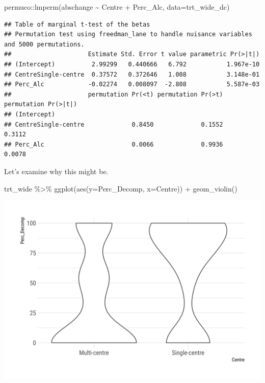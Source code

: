 \documentclass[
]{article}
\newenvironment{Shaded}{\begin{snugshade}}{\end{snugshade}}
\newcommand{\AttributeTok}[1]{\textcolor[rgb]{0.77,0.63,0.00}{#1}}
\newcommand{\FunctionTok}[1]{\textcolor[rgb]{0.00,0.00,0.00}{#1}}
\newcommand{\NormalTok}[1]{#1}
\newcommand{\SpecialCharTok}[1]{\textcolor[rgb]{0.00,0.00,0.00}{#1}}
\begin{document}
\begin{Shaded}
\begin{Highlighting}[]
\NormalTok{permuco}\SpecialCharTok{::}\FunctionTok{lmperm}\NormalTok{(abschange }\SpecialCharTok{\textasciitilde{}}\NormalTok{ Centre }\SpecialCharTok{+}\NormalTok{ Perc\_Alc, }\AttributeTok{data=}\NormalTok{trt\_wide\_dc)}
\end{Highlighting}
\end{Shaded}

\begin{verbatim}
## Table of marginal t-test of the betas
## Permutation test using freedman_lane to handle nuisance variables and 5000 permutations.
##                     Estimate Std. Error t value parametric Pr(>|t|)
## (Intercept)          2.99299   0.440666   6.792           1.967e-10
## CentreSingle-centre  0.37572   0.372646   1.008           3.148e-01
## Perc_Alc            -0.02274   0.008097  -2.808           5.587e-03
##                     permutation Pr(<t) permutation Pr(>t) permutation Pr(>|t|)
## (Intercept)                                                                   
## CentreSingle-centre             0.8450             0.1552               0.3112
## Perc_Alc                        0.0066             0.9936               0.0078
\end{verbatim}

Let's examine why this might be.

\begin{Shaded}
\begin{Highlighting}[]
\NormalTok{trt\_wide }\SpecialCharTok{\%\textgreater{}\%} 
  \FunctionTok{ggplot}\NormalTok{(}\FunctionTok{aes}\NormalTok{(}\AttributeTok{y=}\NormalTok{Perc\_Decomp, }\AttributeTok{x=}\NormalTok{Centre)) }\SpecialCharTok{+} 
  \FunctionTok{geom\_violin}\NormalTok{()}
\end{Highlighting}
\end{Shaded}

\includegraphics{figures/unnamed-chunk-42-1.png}
\end{document}
